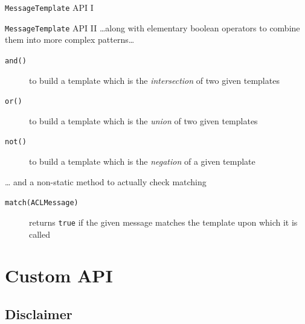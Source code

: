 \documentclass{beamer}\mode<presentation>{\usetheme{AMSCesenaPurpleAndGold}}
\begin{document}
\begin{frame}[c,allowframebreaks]
\begin{block}{\texttt{MessageTemplate} API I}
\begin{description}
        \end{description}
    \end{block}
    \begin{block}{\texttt{MessageTemplate} API II}
        \ldots along with elementary boolean operators to combine them into more complex patterns\ldots
        \begin{description}
            \item[\texttt{and()}] to build a template which is the \emph{intersection} of two given templates
            \item[\texttt{or()}] to build a template which is the \emph{union} of two given templates
            \item[\texttt{not()}] to build a template which is the \emph{negation} of a given template
        \end{description}
        \ldots{} and a non-static method to actually check matching
        \begin{description}
            \item[\texttt{match(ACLMessage)}] returns \texttt{true} if the given message matches the template upon which it is called
        \end{description}
    \end{block}
\end{frame}

\section{Custom API}

\subsection{Disclaimer}
\end{document}
